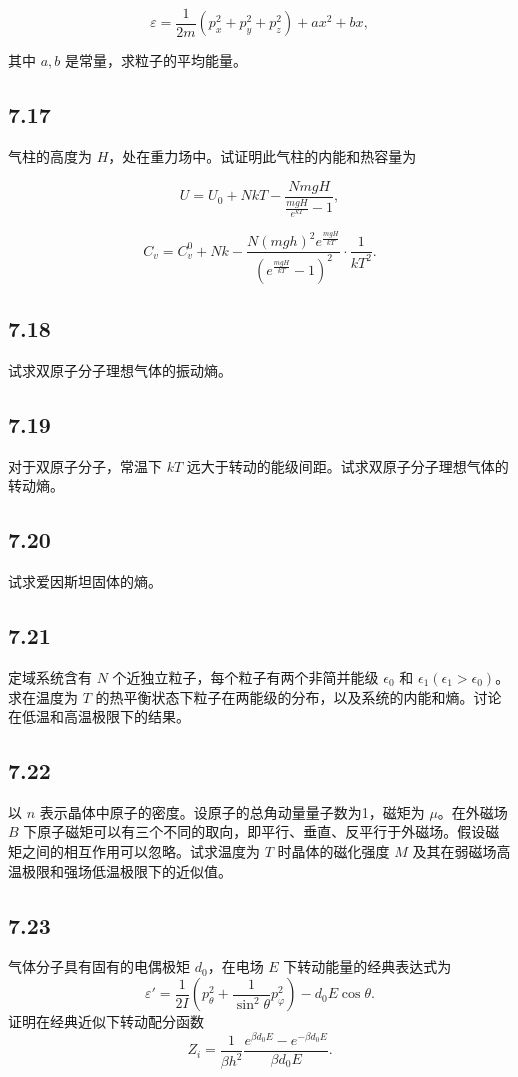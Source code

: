 $$ \varepsilon = \frac{1}{2m} \left( p_x^2 + p_y^2 + p_z^2 \right) + ax^2 + bx, $$

其中 $ a, b $ 是常量，求粒子的平均能量。

\newpage
\subsection{7.17}
气柱的高度为 $ H $，处在重力场中。试证明此气柱的内能和热容量为

$$ U = U_0 + NkT - \frac{NmgH}{\frac{mgH}{e^{kT}} - 1}, $$

$$ C_v = C_v^0 + Nk - \frac{N(mgh)^2 e^{\frac{mgH}{kT}}}{(e^{\frac{mgH}{kT}}-1)^2} \cdot \frac{1}{kT^2}. $$

\newpage
\subsection{7.18}
试求双原子分子理想气体的振动熵。

\newpage
\subsection{7.19}
对于双原子分子，常温下 $kT$ 远大于转动的能级间距。试求双原子分子理想气体的转动熵。

\newpage
\subsection{7.20}
试求爱因斯坦固体的熵。

\newpage
\subsection{7.21}
定域系统含有 $N$ 个近独立粒子，每个粒子有两个非简并能级 $\epsilon_0$ 和 $\epsilon_1 (\epsilon_1 > \epsilon_0)$。求在温度为 $T$ 的热平衡状态下粒子在两能级的分布，以及系统的内能和熵。讨论在低温和高温极限下的结果。

\newpage
\subsection{7.22}
以 $ n $ 表示晶体中原子的密度。设原子的总角动量量子数为1，磁矩为 $\mu$。在外磁场 $ B $ 下原子磁矩可以有三个不同的取向，即平行、垂直、反平行于外磁场。假设磁矩之间的相互作用可以忽略。试求温度为 $ T $ 时晶体的磁化强度 $ M $ 及其在弱磁场高温极限和强场低温极限下的近似值。

\newpage
\subsection{7.23}
气体分子具有固有的电偶极矩 $ d_0 $，在电场 $ E $ 下转动能量的经典表达式为
$$\varepsilon' = \frac{1}{2I} \left( p_\theta^2 + \frac{1}{\sin^2 \theta} p_\varphi^2 \right) - d_0 E \cos \theta.$$
证明在经典近似下转动配分函数
$$Z_i = \frac{1}{\beta h^2} \frac{e^{\beta d_0 E} - e^{-\beta d_0 E}}{\beta d_0 E}.$$

